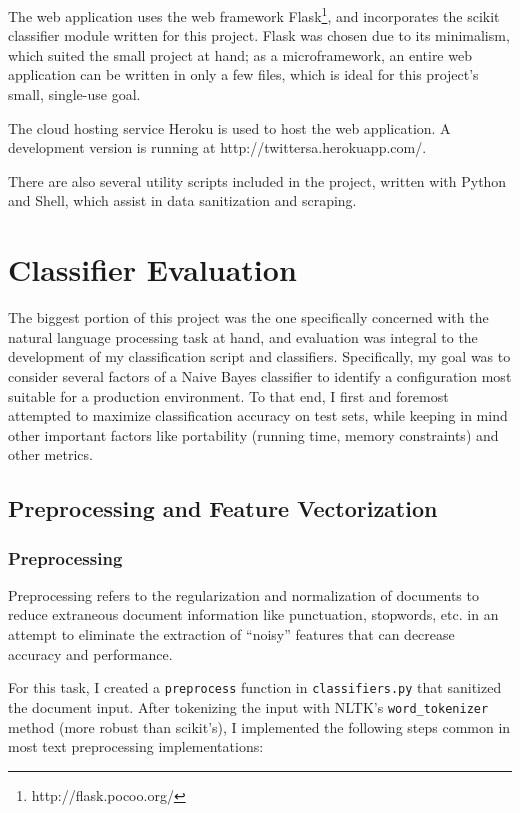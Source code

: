 \documentclass[letter,12pt]{article}
\begin{document}
The web application uses the web framework
Flask\footnote{http://flask.pocoo.org/}, and incorporates the scikit classifier
module written for this project. Flask was chosen due to its minimalism, which
suited the small project at hand; as a microframework, an entire web
application can be written in only a few files, which is ideal for this
project's small, single-use goal.

The cloud hosting service Heroku is used to host the web application. A
development version is running at http://twittersa.herokuapp.com/.

There are also several utility scripts included in the project, written with
Python and Shell, which assist in data sanitization and scraping.

\section{Classifier Evaluation}

The biggest portion of this project was the one specifically concerned with the
natural language processing task at hand, and evaluation was integral to the
development of my classification script and classifiers. Specifically, my goal
was to consider several factors of a Naive Bayes classifier to identify a
configuration most suitable for a production environment. To that end, I first
and foremost attempted to maximize classification accuracy on test sets, while
keeping in mind other important factors like portability (running time, memory
constraints) and other metrics.

\subsection{Preprocessing and Feature Vectorization}

\subsubsection{Preprocessing}

Preprocessing refers to the regularization and normalization of documents to
reduce extraneous document information like punctuation, stopwords, etc. in an
attempt to eliminate the extraction of ``noisy'' features that can decrease
accuracy and performance.

For this task, I created a \texttt{preprocess} function in
\texttt{classifiers.py} that sanitized the document input. After tokenizing the
input with NLTK's \texttt{word\_tokenizer} method (more robust than scikit's),
I implemented the following steps common in most text preprocessing
implementations:
\end{document}
